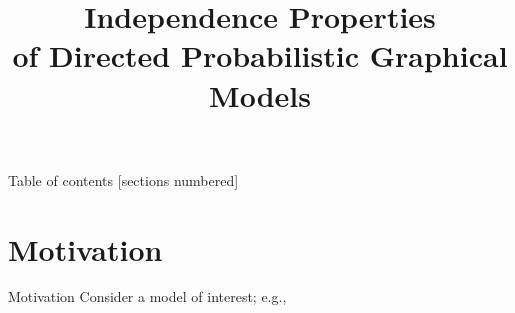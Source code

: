 \documentclass[10pt]{beamer}
\title{Independence Properties \\ of Directed Probabilistic Graphical Models}
\newcommand{\x}{X}
\newcommand{\y}{Y}
\begin{document}
\maketitle

\begin{frame}{Table of contents}
  [sections numbered]
  \tableofcontents[hideallsubsections]
\end{frame}

\section{Motivation}
\begin{frame}{Motivation}
Consider a model of interest; e.g.,


\end{frame}
\end{document}
